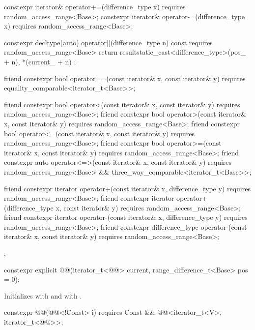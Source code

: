 \documentclass{wg21}
\begin{document}
\begin{codeblock}
{{        constexpr iterator& operator+=(difference_type x)
        requires random_access_range<Base>;
        constexpr iterator& operator-=(difference_type x)
        requires random_access_range<Base>;
        
        constexpr decltype(auto) operator[](difference_type n) const
        requires random_access_range<Base>
        { return result{static_cast<difference_type>(pos_ + n), *(current_ + n) }; }
        
        
        friend constexpr bool operator==(const iterator& x, const iterator& y)
        requires equality_comparable<iterator_t<Base>>;
        
        friend constexpr bool operator<(const iterator& x, const iterator& y)
        requires random_access_range<Base>;
        friend constexpr bool operator>(const iterator& x, const iterator& y)
        requires random_access_range<Base>;
        friend constexpr bool operator<=(const iterator& x, const iterator& y)
        requires random_access_range<Base>;
        friend constexpr bool operator>=(const iterator& x, const iterator& y)
        requires random_access_range<Base>;
        friend constexpr auto operator<=>(const iterator& x, const iterator& y)
        requires random_access_range<Base> && three_way_comparable<iterator_t<Base>>;
        
        friend constexpr iterator operator+(const iterator& x, difference_type y)
        requires random_access_range<Base>;
        friend constexpr iterator operator+(difference_type x, const iterator& y)
        requires random_access_range<Base>;
        friend constexpr iterator operator-(const iterator& x, difference_type y)
        requires random_access_range<Base>;
        friend constexpr difference_type operator-(const iterator& x, const iterator& y)
        requires random_access_range<Base>;
    };
}
\end{codeblock}


\begin{itemdecl}
    constexpr explicit @@(iterator_t<@@> current, range_difference_t<Base> pos = 0);
\end{itemdecl}

\begin{itemdescr}
    \pnum
    \effects
    Initializes  with  and  with .
\end{itemdescr}

\begin{itemdecl}
    constexpr @@(@@<!Const> i)
    requires Const && @@<iterator_t<V>, iterator_t<@@>>;
\end{itemdecl}
\end{document}
